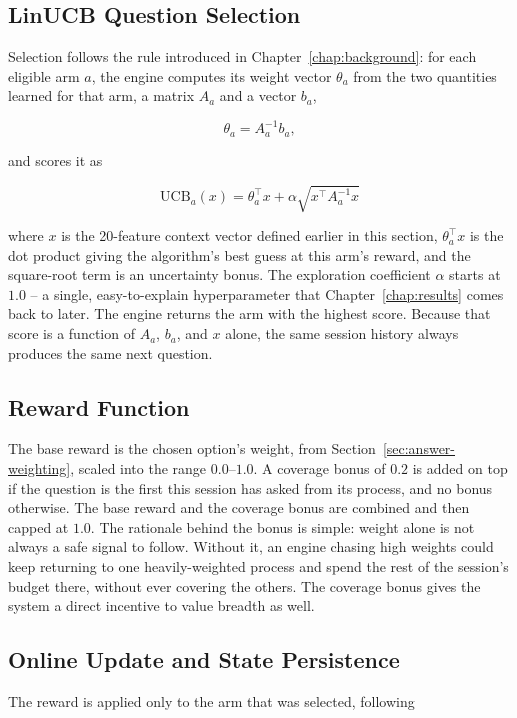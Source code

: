 \documentclass[a4paper, 12pt, oneside, openany, BCOR1cm,toc=chapterentrywithdots]{scrbook}
\begin{document}
\subsection{LinUCB Question Selection}

Selection follows the rule introduced in Chapter~\ref{chap:background}: for each eligible arm
$a$, the engine computes its weight vector $\theta_a$ from the two quantities learned for that
arm, a matrix $A_a$ and a vector $b_a$,

\[
\theta_a = A_a^{-1} b_a ,
\]

and scores it as

\[
\mathrm{UCB}_a(x) = \theta_a^\top x + \alpha \sqrt{x^\top A_a^{-1} x}
\]

where $x$ is the 20-feature context vector defined earlier in this section,
$\theta_a^\top x$ is the dot product giving the algorithm's best guess at this arm's reward, and
the square-root term is an uncertainty bonus. The exploration coefficient $\alpha$
starts at $1.0$ -- a single, easy-to-explain hyperparameter that Chapter~\ref{chap:results} comes
back to later. The engine returns the arm with the highest score. Because that score is a
function of $A_a$, $b_a$, and $x$ alone, the same session history always produces the same next
question.

\subsection{Reward Function}

The base reward is the chosen option's weight, from Section~\ref{sec:answer-weighting}, scaled
into the range $0.0$--$1.0$. A coverage bonus of $0.2$ is added on top if the question is the
first this session has asked from its process, and no bonus otherwise. The base reward and the
coverage bonus are combined and then capped at $1.0$. The rationale behind the bonus is simple:
weight alone is not always a safe signal to follow. Without it, an engine chasing high weights
could keep returning to one heavily-weighted process and spend the rest of the session's budget
there, without ever covering the others. The coverage bonus gives the system a direct incentive
to value breadth as well.

\subsection{Online Update and State Persistence}

The reward is applied only to the arm that was selected, following
\end{document}

